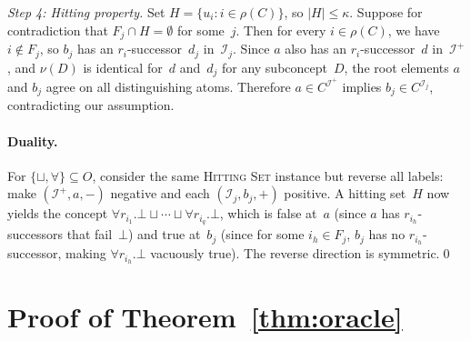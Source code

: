 \documentclass[accepted]{uai2026} %
\theoremstyle{definition}
\theoremstyle{remark}
\begin{document}
\emph{Step 4: Hitting property.}
Set $H = \{u_i : i \in \rho(C)\}$, so
$|H| \leq \kappa$.
Suppose for contradiction that $F_j \cap H = \emptyset$ for
some~$j$. Then for every $i \in \rho(C)$, we have
$i \notin F_j$,
so $b_j$ has an $r_i$-successor~$d_j$ in~$\mathcal{I}_j$.
Since $a$ also has an $r_i$-successor~$d$ in~$\mathcal{I}^+$,
and $\nu(D)$ is identical for~$d$ and~$d_j$ for any
subconcept~$D$, the root elements $a$ and $b_j$ agree on all
distinguishing atoms. Therefore
$a \in C^{\mathcal{I}^+}$ implies
$b_j \in C^{\mathcal{I}_j}$, contradicting our assumption.

\paragraph{Duality.}
For $\{\sqcup, \forall\} \subseteq O$, consider the same
\textsc{Hitting Set} instance but reverse all labels: make
$(\mathcal{I}^+, a, -)$ negative and each
$(\mathcal{I}_j, b_j, +)$ positive. A hitting set~$H$ now
yields the concept
$\forall r_{i_1}.\bot \sqcup \cdots \sqcup
\forall r_{i_q}.\bot$, which is false at~$a$ (since $a$ has
$r_{i_h}$-successors that fail~$\bot$) and true at~$b_j$
(since for some $i_h \in F_j$, $b_j$ has no
$r_{i_h}$-successor, making $\forall r_{i_h}.\bot$ vacuously
true). The reverse direction is symmetric.\qed

\section{Proof of Theorem~\ref{thm:oracle}}\label{app:oracle}
\end{document}
